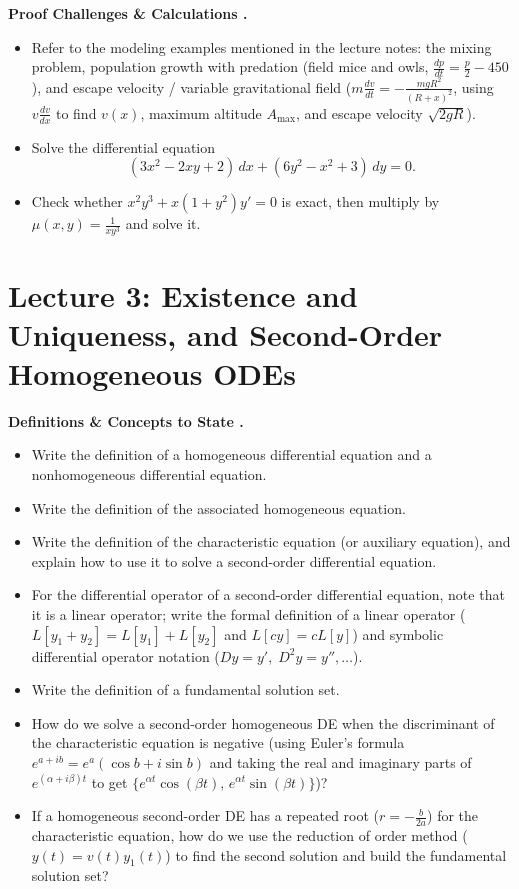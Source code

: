 \documentclass{../../../templates/natsirt}
\newcounter{topic}[section]
\newenvironment{recallbox}[1][]{%
    \begin{bluebox}[#1]\refstepcounter{topic}\textbf{Definitions \& Concepts to State \thesection.\thetopic}%
}{\end{bluebox}}
\newenvironment{challengebox}[1][]{%
    \begin{redbox}[#1]\refstepcounter{topic}\textbf{Proof Challenges \& Calculations \thesection.\thetopic}%
}{\end{redbox}}
\newcommand{\citem}{\item[$\square$]}
\begin{document}
\begin{challengebox}
\begin{itemize}
    \citem Refer to the modeling examples mentioned in the lecture notes: the mixing problem, population growth with predation (field mice and owls, $\frac{dp}{dt} = \frac{p}{2} - 450$), and escape velocity / variable gravitational field ($m\frac{dv}{dt} = -\frac{mgR^2}{(R+x)^2}$, using $v\frac{dv}{dx}$ to find $v(x)$, maximum altitude $A_{\max}$, and escape velocity $\sqrt{2gR}$).
    \citem Solve the differential equation
    \[
        (3x^2 - 2xy + 2)\,dx + (6y^2 - x^2 + 3)\,dy = 0.
    \]
    \citem Check whether $x^2y^3 + x(1 + y^2)y' = 0$ is exact, then multiply by $\mu(x,y) = \frac{1}{xy^3}$ and solve it.
\end{itemize}
\end{challengebox}

\section{Lecture 3: Existence and Uniqueness, and Second-Order Homogeneous ODEs}

\begin{recallbox}
\begin{itemize}
    \citem Write the definition of a homogeneous differential equation and a nonhomogeneous differential equation.
    \citem Write the definition of the associated homogeneous equation.
    \citem Write the definition of the characteristic equation (or auxiliary equation), and explain how to use it to solve a second-order differential equation.
    \citem For the differential operator of a second-order differential equation, note that it is a linear operator; write the formal definition of a linear operator ($L[y_1 + y_2] = L[y_1] + L[y_2]$ and $L[cy] = cL[y]$) and symbolic differential operator notation ($Dy = y', \; D^2y = y'', \dots$).
    \citem Write the definition of a fundamental solution set.
    \citem How do we solve a second-order homogeneous DE when the discriminant of the characteristic equation is negative (using Euler's formula $e^{a+ib} = e^a(\cos b + i\sin b)$ and taking the real and imaginary parts of $e^{(\alpha + i\beta)t}$ to get $\{e^{\alpha t}\cos(\beta t), \, e^{\alpha t}\sin(\beta t)\}$)?
    \citem If a homogeneous second-order DE has a repeated root ($r = -\frac{b}{2a}$) for the characteristic equation, how do we use the reduction of order method ($y(t) = v(t)y_1(t)$) to find the second solution and build the fundamental solution set?
\end{itemize}
\end{recallbox}
\end{document}
